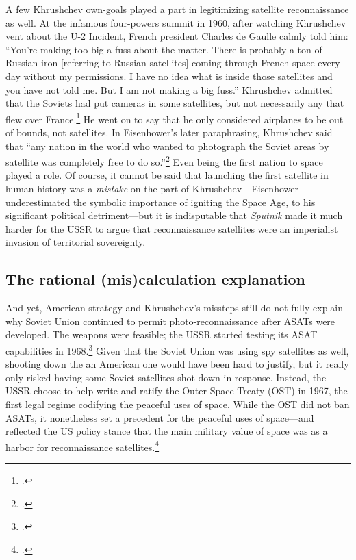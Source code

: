 \documentclass{memoir}
\begin{document}
A few Khrushchev own-goals played a part in legitimizing satellite reconnaissance as well. At the infamous four-powers summit in 1960, after watching Khrushchev vent about the U-2 Incident, French president Charles de Gaulle calmly told him: ``You're making too big a fuss about the matter. There is probably a ton of Russian iron [referring to Russian satellites] coming through French space every day without my permissions. I have no idea what is inside those satellites and you have not told me. But I am not making a big fuss.'' Khrushchev admitted that the Soviets had put cameras in some satellites, but not necessarily any that flew over France.\footcite[p.~353]{brugioni_eyes_2010} He went on to say that he only considered airplanes to be out of bounds, not satellites. In Eisenhower's later paraphrasing, Khrushchev said that ``any nation in the world who wanted to photograph the Soviet areas by satellite was completely free to do so.''\footcite[p.~556]{eisenhower_waging_1965} Even being the first nation to space played a role. Of course, it cannot be said that launching the first satellite in human history was a \emph{mistake} on the part of Khrushchev---Eisenhower underestimated the symbolic importance of igniting the Space Age, to his significant political detriment---but it is indisputable that \emph{Sputnik} made it much harder for the USSR to argue that reconnaissance satellites were an imperialist invasion of territorial sovereignty.

\subsection{The rational (mis)calculation explanation}
And yet, American strategy and Khrushchev's missteps still do not fully explain why Soviet Union continued to permit photo-reconnaissance after ASATs were developed. The weapons were feasible; the USSR started testing its ASAT capabilities in 1968.\footcite[p.~149]{karas_new_1983} Given that the Soviet Union was using spy satellites as well, shooting down the an American one would have been hard to justify, but it really only risked having some Soviet satellites shot down in response. Instead, the USSR choose to help write and ratify the Outer Space Treaty (OST) in 1967, the first legal regime codifying the peaceful uses of space. While the OST did not ban ASATs, it nonetheless set a precedent for the peaceful uses of space---and reflected the US policy stance that the main military value of space was as a harbor for reconnaissance satellites.\footcite[p~16]{mowthorpe_militarization_2004}
\end{document}
